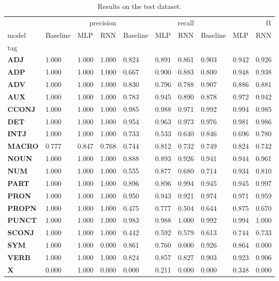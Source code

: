 \begin{table}
\caption{Results on the test dataset.}
\label{tab::ex_2_test}
\begin{tabular}{|l||l||l||l||l||l||l||l||l||l|}
\toprule
 & \multicolumn{3}{r}{precision} & \multicolumn{3}{r}{recall} & \multicolumn{3}{r}{f1} \\
model & Baseline & MLP & RNN & Baseline & MLP & RNN & Baseline & MLP & RNN \\
tag &  &  &  &  &  &  &  &  &  \\
\midrule
\textbf{ADJ} & 1.000 & 1.000 & 1.000 & 0.824 & 0.891 & 0.861 & 0.903 & 0.942 & 0.926 \\
\textbf{ADP} & 1.000 & 1.000 & 1.000 & 0.667 & 0.900 & 0.883 & 0.800 & 0.948 & 0.938 \\
\textbf{ADV} & 1.000 & 1.000 & 1.000 & 0.830 & 0.796 & 0.788 & 0.907 & 0.886 & 0.881 \\
\textbf{AUX} & 1.000 & 1.000 & 1.000 & 0.783 & 0.945 & 0.890 & 0.878 & 0.972 & 0.942 \\
\textbf{CCONJ} & 1.000 & 1.000 & 1.000 & 0.985 & 0.988 & 0.971 & 0.992 & 0.994 & 0.985 \\
\textbf{DET} & 1.000 & 1.000 & 1.000 & 0.954 & 0.963 & 0.973 & 0.976 & 0.981 & 0.986 \\
\textbf{INTJ} & 1.000 & 1.000 & 1.000 & 0.733 & 0.533 & 0.640 & 0.846 & 0.696 & 0.780 \\
\textbf{MACRO} & 0.777 & 0.847 & 0.768 & 0.744 & 0.812 & 0.732 & 0.749 & 0.824 & 0.742 \\
\textbf{NOUN} & 1.000 & 1.000 & 1.000 & 0.888 & 0.893 & 0.926 & 0.941 & 0.944 & 0.961 \\
\textbf{NUM} & 1.000 & 1.000 & 1.000 & 0.555 & 0.877 & 0.680 & 0.714 & 0.934 & 0.810 \\
\textbf{PART} & 1.000 & 1.000 & 1.000 & 0.896 & 0.896 & 0.994 & 0.945 & 0.945 & 0.997 \\
\textbf{PRON} & 1.000 & 1.000 & 1.000 & 0.950 & 0.943 & 0.921 & 0.974 & 0.971 & 0.959 \\
\textbf{PROPN} & 1.000 & 1.000 & 1.000 & 0.475 & 0.777 & 0.504 & 0.644 & 0.875 & 0.670 \\
\textbf{PUNCT} & 1.000 & 1.000 & 1.000 & 0.983 & 0.988 & 1.000 & 0.992 & 0.994 & 1.000 \\
\textbf{SCONJ} & 1.000 & 1.000 & 1.000 & 0.442 & 0.592 & 0.579 & 0.613 & 0.744 & 0.733 \\
\textbf{SYM} & 1.000 & 1.000 & 0.000 & 0.861 & 0.760 & 0.000 & 0.926 & 0.864 & 0.000 \\
\textbf{VERB} & 1.000 & 1.000 & 1.000 & 0.824 & 0.857 & 0.827 & 0.903 & 0.923 & 0.906 \\
\textbf{X} & 0.000 & 1.000 & 0.000 & 0.000 & 0.211 & 0.000 & 0.000 & 0.348 & 0.000 \\
\bottomrule
\end{tabular}
\end{table}

